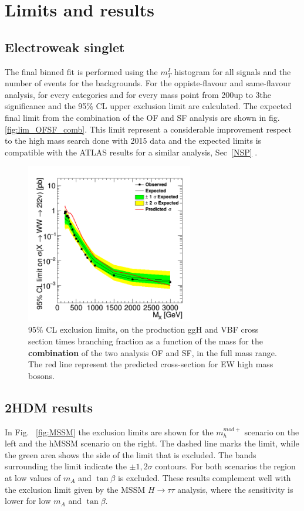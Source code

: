 
\section{Limits and results}

\subsection*{Electroweak singlet}
The final binned fit is performed using the $m_T^I$ histogram for all signals and the number of events for the backgrounds.
For the oppiste-flavour and same-flavour analysis, for every categories and for every mass point from
200\GeV up to 3\TeV the significance  and the 95\% CL
upper exclusion limit are calculated.
The expected final limit from the combination of the OF and SF analysis are shown in fig. \ref{fig:lim_OFSF_comb}. 
This limit represent a 	considerable improvement respect to the high mass search done with 2015 data and the expected limits is compatible with the ATLAS results for a similar analysis, Sec~\ref{NSP} .\\
\begin{figure}[htb]
\centering
\includegraphics[width=0.65\textwidth]{../AN/Figs/unblinding/Limits/c2_FullComb_unbl.png}
\caption{95$\%$ CL exclusion limits,  on the production ggH and VBF cross section times branching fraction as a function of the mass for the { \bf combination} of the two analysis OF and SF, in the full mass range.   The red  line represent the predicted cross-section for EW high mass bosons.}
\label{fig:sig_OFSF_comb_un}
\end{figure}


\subsection*{2HDM results}
In Fig. ~\ref{fig:MSSM} the exclusion limits are shown for the $m_h^{mod+}$ scenario on the left and the hMSSM scenario on the right. The dashed line marks the limit, while the green area shows the side of the limit that is excluded. The bands surrounding the limit indicate the $\pm 1,2\sigma$ contours. For both scenarios the region at low values of $m_{A}$ and $\tan\beta$ is excluded. These results complement well with the exclusion limit given by the MSSM $H\rightarrow\tau\tau$ analysis, where the sensitivity is lower for low $m_{A}$ and $\tan\beta$.

